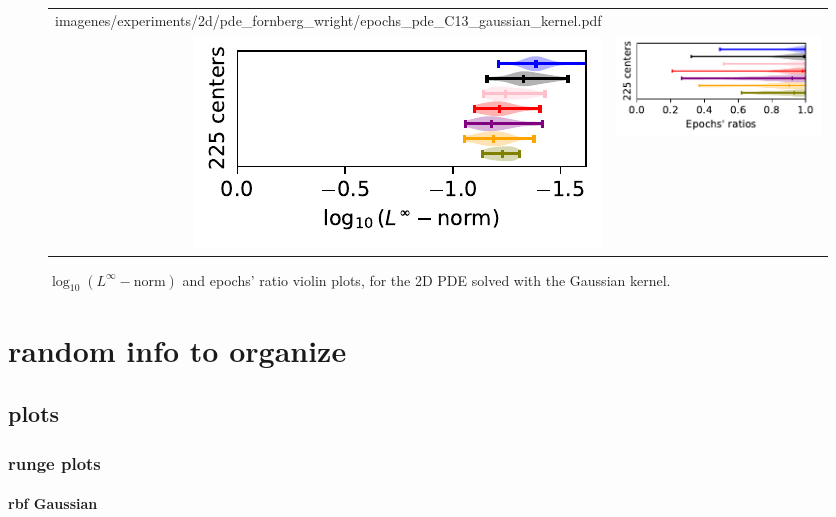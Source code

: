 \documentclass[12pt]{report} %
\begin{document}
\begin{figure}[h]
\begin{tabular}{rl}
{        {imagenes/experiments/2d/pde_fornberg_wright/epochs_pde_C13_gaussian_kernel.pdf}}
    \\
    {\includegraphics[width=.5\textwidth, trim={0 0.2cm 0 0},clip=true]
    {imagenes/experiments/2d/pde_fornberg_wright/linf_pde_C15_gaussian_kernel.pdf}}
                                                                                                              & 
  {\includegraphics[width=.44\textwidth, trim={.7cm 0.2cm 0 0},clip=true]
        {imagenes/experiments/2d/pde_fornberg_wright/epochs_pde_C15_gaussian_kernel.pdf}}
  \end{tabular}
  \caption{$\log_{10}(L^\infty-\text{norm})$ and epochs' ratio violin plots, for the 2D PDE solved with the Gaussian kernel.}
  \label{fig:statistic-result-pde-gaussian-kernel}
\end{figure}

\chapter{random info to organize}
  

\section{plots}
\subsection{runge plots}

\subsubsection{rbf Gaussian}
\end{document}
